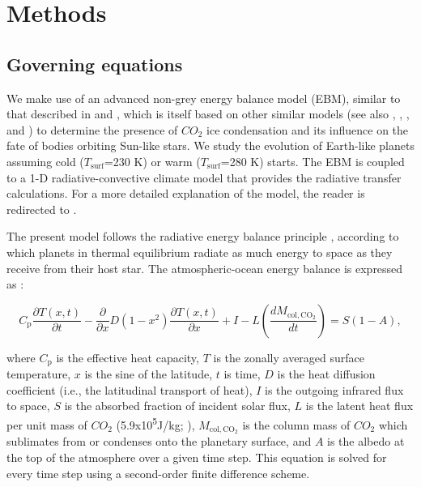 \documentclass[fleqn,usenatbib]{mnras}
\begin{document}
\section{Methods}
\subsection{Governing equations}
We make use of an advanced non-grey energy balance model (EBM), similar to that described in \citet{RamirezLevi2018} and \cite{ramirez2020}, which is itself based on  other similar models (see also \citet{North1979},  \citet{North1981}, \citet{Williams1997}, and \citet{vladilo2013}) to determine the presence of $CO_{\mathrm{2}}$ ice condensation and its influence on the fate of bodies orbiting Sun-like stars. We study the evolution of Earth-like planets assuming cold ($T_{\mathrm{surf}}$=230 K) or warm ($T_{\mathrm{surf}}$=280 K) starts. The EBM is coupled to a 1-D radiative-convective climate model that provides the radiative transfer calculations. For a more detailed explanation of the model, the reader is redirected to \citet{ramirez2020}. 

The present model follows the radiative energy balance principle \citep[e.g.,][]{Williams1997}, according to which planets in thermal equilibrium radiate as much energy to space as they receive from their host star. The atmospheric-ocean energy balance is expressed as \citep[e.g.,][]{james1982,Williams1997}: 

\begin{equation}
\label{ebmeq}
    C_{\mathrm{p}} \frac{\partial T(x, t)}{\partial t}-\frac{\partial}{\partial x} D\left(1-x^{2}\right) \frac{\partial T(x, t)}{\partial x}+I-L\left (\frac{dM_{\mathrm{col,CO_{\mathrm{2}}}}}{dt}\right )=S(1-A),
\end{equation}{}

where $C_{\mathrm{p}}$ is the effective heat capacity, $T$ is the zonally averaged surface temperature, $x$ is the sine of the latitude, $t$ is time, $D$ is the heat diffusion coefficient (i.e., the latitudinal transport of heat), $I$ is the outgoing infrared flux to space, $S$ is the absorbed fraction of incident solar flux, $L$ is the latent heat flux per unit mass of $CO_{\mathrm{2}}$ (5.9x10\textsuperscript{5}J/kg; \citet{forget1998}), $M_{\mathrm{col,CO_{\mathrm{2}}}}$ is the column mass of $CO_{\mathrm{2}}$ which sublimates from or condenses onto the planetary surface, and $A$ is the albedo at the top of the atmosphere over a given time step. This equation is solved for every time step using a second-order finite difference scheme.
\end{document}

